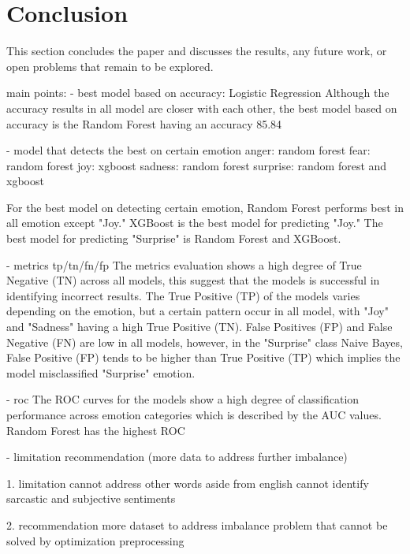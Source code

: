

\section{Conclusion}
This section concludes the paper and discusses the results, any future work, or open problems that remain to be explored.

main points:
- best model based on accuracy: Logistic Regression
Although the accuracy results in all model are closer with each other, the best model based on accuracy is the Random Forest having an accuracy 85.84%

- model that detects the best on certain emotion
anger: random forest
fear: random forest
joy: xgboost
sadness: random forest
surprise: random forest and xgboost

For the best model on detecting certain emotion, Random Forest performs best in all emotion except "Joy." XGBoost is the best model for predicting "Joy." The best model for predicting "Surprise" is Random Forest and XGBoost. 

- metrics tp/tn/fn/fp
The metrics evaluation shows a high degree of True Negative (TN) across all models, this suggest that the models is successful in identifying incorrect results. The True Positive (TP) of the models varies depending on the emotion, but a certain pattern occur in all model, with "Joy" and "Sadness" having a high True Positive (TN). False Positives (FP) and False Negative (FN) are low in all models, however, in the "Surprise" class Naive Bayes, False Positive (FP) tends to be higher than True Positive (TP) which implies the model misclassified "Surprise" emotion.

- roc
The ROC curves for the models show a high degree of classification performance across emotion categories which is described by the AUC values. Random Forest has the highest ROC

- limitation recommendation (more data to address further imbalance)

1. limitation
cannot address other words aside from english
cannot identify sarcastic and subjective sentiments

2. recommendation
more dataset to address imbalance problem that cannot be solved by optimization preprocessing
